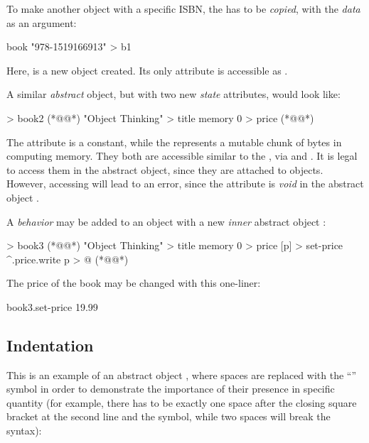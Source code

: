 To make another object with a specific ISBN, the 
has to be \emph{copied}, with the \emph{data} as an argument:

\begin{ffcode}
book "978-1519166913" > b1
\end{ffcode}

Here,  is a new object created.
Its only attribute is accessible as .

A similar \emph{abstract} object, but with two new \emph{state} attributes, would
look like:

\begin{ffcode}
[isbn] > book2  (*@\label{ln:book2}@*)
  "Object Thinking" > title
  memory 0 > price (*@\label{ln:book2-end}@*)
\end{ffcode}

The attribute  is a constant, while the 
represents a mutable chunk of bytes in computing memory. They both are
accessible similar to the , via 
and . It is legal to access them in the abstract
object, since they are attached to objects. However, accessing 
will lead to an error, since the attribute  is \emph{void}
in the abstract object .

A \emph{behavior} may be added to an object with a new \emph{inner}
abstract object :

\begin{ffcode}
[isbn] > book3 (*@\label{ln:book3}@*)
  "Object Thinking" > title
  memory 0 > price
  [p] > set-price
    ^.price.write p > @ (*@\label{ln:book3-end}@*)
\end{ffcode}

The price of the book may be changed with this one-liner:

\begin{ffcode}
book3.set-price 19.99
\end{ffcode}

\subsection{Indentation}

This is an example of an abstract object , where
spaces are replaced with the ``\textvisiblespace'' symbol in order to demonstrate
the importance of their presence in specific quantity
(for example, there has to be exactly one space after the closing square bracket at the
second line and the \ff{>} symbol, while two spaces will break the syntax):

